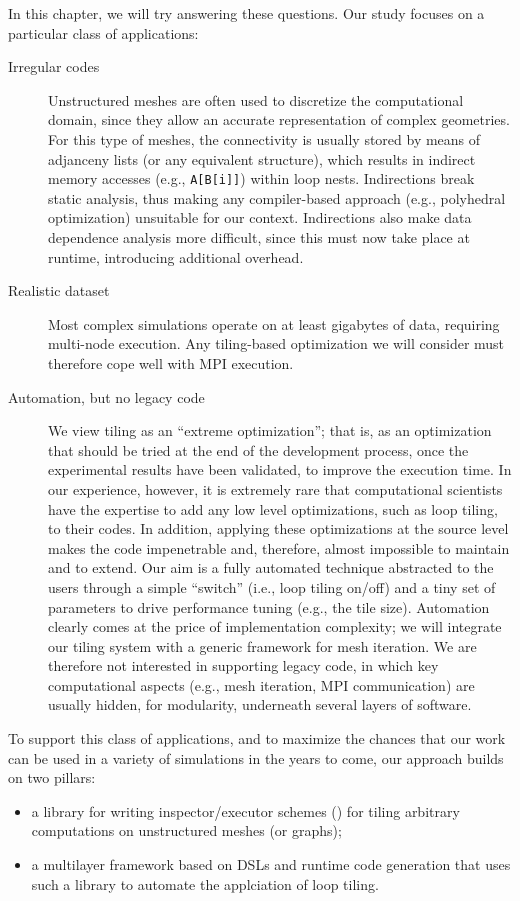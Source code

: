 In this chapter, we will try answering these questions. Our study focuses on a particular class of applications:
\begin{description}
\item[Irregular codes] Unstructured meshes are often used to discretize the computational domain, since they allow an accurate representation of complex geometries. For this type of meshes, the connectivity is usually stored by means of adjanceny lists (or any equivalent structure), which results in indirect memory accesses (e.g., \texttt{A[B[i]]}) within loop nests. Indirections break static analysis, thus making any compiler-based approach (e.g., polyhedral optimization) unsuitable for our context. Indirections also make data dependence analysis more difficult, since this must now take place at runtime, introducing additional overhead.
\item[Realistic dataset] Most complex simulations operate on at least gigabytes of data, requiring multi-node execution. Any tiling-based optimization we will consider must therefore cope well with MPI execution.
\item[Automation, but no legacy code] We view tiling as an ``extreme optimization''; that is, as an optimization that should be tried at the end of the development process, once the experimental results have been validated, to improve the execution time. In our experience, however, it is extremely rare that computational scientists have the expertise to add any low level optimizations, such as loop tiling, to their codes. In addition, applying these optimizations at the source level makes the code impenetrable and, therefore, almost impossible to maintain and to extend. Our aim is a fully automated technique abstracted to the users through a simple ``switch'' (i.e., loop tiling on/off) and a tiny set of parameters to drive performance tuning (e.g., the tile size). Automation clearly comes at the price of implementation complexity; we will integrate our tiling system with a generic framework for mesh iteration. We are therefore not interested in supporting legacy code, in which key computational aspects (e.g., mesh iteration, MPI communication) are usually hidden, for modularity, underneath several layers of software.
\end{description}

To support this class of applications, and to maximize the chances that our work can be used in a variety of simulations in the years to come, our approach builds on two pillars:
\begin{itemize}
\item a library for writing inspector/executor schemes (\cite{IEscheme}) for tiling arbitrary computations on unstructured meshes (or graphs);
\item a multilayer framework based on DSLs and runtime code generation that uses such a library to automate the applciation of loop tiling.
\end{itemize}

